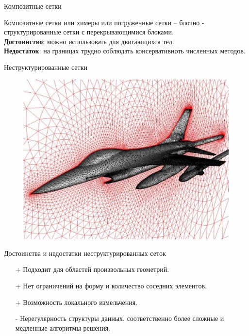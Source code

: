 \documentclass[10pt,xcolor=pst,aspectratio=169]{beamer}
\begin{document}
\begin{frame}{Композитные сетки}

	\transdissolve[duration=0.1]
	\justifying
	\large
	
	Композитные сетки или химеры или погруженные сетки -- блочно - структурированные сетки с перекрывающимися блоками.\\
	\textbf{Достоинство}: можно использовать для двигающихся тел.\\
	\textbf{Недостаток}: на границах трудно соблюдать консервативноть численных методов.

\end{frame}

\begin{frame}{Неструктурированные сетки}

	\transdissolve[duration=0.1]
	\justifying
	\large

	\begin{figure}
		\includegraphics[width=0.6\linewidth]{unstructured_mesh_example_1.eps}
	\end{figure}

\end{frame}

\begin{frame}{Достоинства и недостатки неструктурированных сеток}

	\transdissolve[duration=0.1]
	\justifying
	\large
	
	\begin{itemize}
		\item[+] Подходит для областей произвольных геометрий.
		\item[+] Нет ограничений на форму и количество соседних элементов.
		\item[+] Возможность локального измельчения.
		\item[-] Нерегулярность структуры данных, соответственно более
сложные и медленные алгоритмы решения.
	\end{itemize}

\end{frame}
\end{document}
